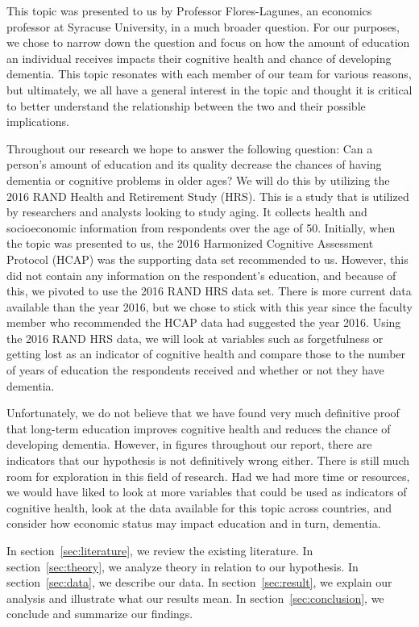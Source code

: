 \documentclass{article}
\begin{document}
This topic was presented to us by Professor Flores-Lagunes, an economics professor at Syracuse University, in a much broader question. For our purposes, we chose to narrow down the question and focus on how the amount of education an individual receives impacts their cognitive health and chance of developing dementia. This topic resonates with each member of our team for various reasons, but ultimately, we all have a general interest in the topic and thought it is critical to better understand the relationship between the two and their possible implications.

Throughout our research we hope to answer the following question: Can a person’s amount of education and its quality decrease the chances of having dementia or cognitive problems in older ages? We will do this by utilizing the 2016 RAND Health and Retirement Study (HRS). This is a study that is utilized by researchers and analysts looking to study aging. It collects health and socioeconomic information from respondents over the age of 50. Initially, when the topic was presented to us, the 2016 Harmonized Cognitive Assessment Protocol (HCAP) was the supporting data set recommended to us. However, this did not contain any information on the respondent’s education, and because of this, we pivoted to use the 2016 RAND HRS data set. There is more current data available than the year 2016, but we chose to stick with this year since the faculty member who recommended the HCAP data had suggested the year 2016. Using the 2016 RAND HRS data, we will look at variables such as forgetfulness or getting lost as an indicator of cognitive health and compare those to the number of years of education the respondents received and whether or not they have dementia. 

Unfortunately, we do not believe that we have found very much definitive proof that long-term education improves cognitive health and reduces the chance of developing dementia. However, in figures throughout our report, there are indicators that our hypothesis is not definitively wrong either. There is still much room for exploration in this field of research. Had we had more time or resources, we would have liked to look at more variables that could be used as indicators of cognitive health, look at the data available for this topic across countries, and consider how economic status may impact education and in turn, dementia. 

In section~\ref{sec:literature}, we review the existing literature. In section~\ref{sec:theory}, we analyze theory in relation to our hypothesis. In section~\ref{sec:data}, we describe our data. In section~\ref{sec:result}, we explain our analysis and illustrate what our results mean. In section~\ref{sec:conclusion}, we conclude and summarize our findings.
\end{document}

